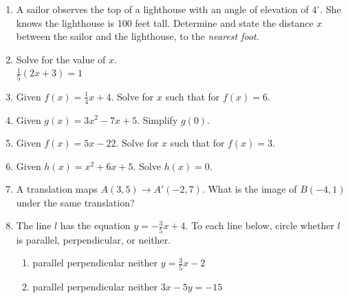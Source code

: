 \documentclass[12pt, twoside]{article}
\begin{document}
\begin{enumerate}
   \item A sailor observes the top of a lighthouse with an angle of elevation of $4^\circ$. She knows the lighthouse is 100 feet tall. Determine and state the distance $x$ between the sailor and the lighthouse, to the \emph{nearest foot}.\\[0.25cm]
    \vspace{3.25cm}

\newpage
\item   Solve for the value of $x$.\\[0.5cm]
$\frac{1}{5}(2x+3)=1$ \vspace{3cm}

\item Given $f(x)=\frac{1}{4} x+4$. Solve for $x$ such that for $f(x)=6$. \vspace{3.5cm}
\item Given $g(x)=3x^2-7x+5$. Simplify $g(0)$. \vspace{2cm}
\item Given $f(x)=5x-22$. Solve for $x$ such that for $f(x)=3$. \vspace{3.5cm}
\item Given $h(x)=x^2+6x+5$. Solve $h(x)=0$. \vspace{3cm}

\newpage
\item A translation maps $A(3,5) \rightarrow A'(-2,7)$. What is the image of $B(-4,1)$ under the same translation?  \vspace{1.5cm}

\item The line $l$ has the equation $y=-\frac{3}{5}x+4$. To each line below, circle whether $l$ is parallel, perpendicular, or neither.
  \begin{enumerate}
    \item parallel \quad perpendicular \quad neither \qquad $y=\frac{3}{5}x-2$
    \vspace{0.5cm}
    \item parallel \quad perpendicular \quad neither \qquad $3x-5y=-15$
    \vspace{2.5cm}
  \end{enumerate}


\end{enumerate}
\end{document}
